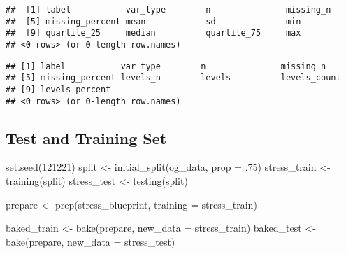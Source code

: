 \documentclass[
]{article}
\newenvironment{Shaded}{\begin{snugshade}}{\end{snugshade}}
\newcommand{\AttributeTok}[1]{\textcolor[rgb]{0.77,0.63,0.00}{#1}}
\newcommand{\DecValTok}[1]{\textcolor[rgb]{0.00,0.00,0.81}{#1}}
\newcommand{\FunctionTok}[1]{\textcolor[rgb]{0.00,0.00,0.00}{#1}}
\newcommand{\NormalTok}[1]{#1}
\newcommand{\OtherTok}[1]{\textcolor[rgb]{0.56,0.35,0.01}{#1}}
\newcommand{\SpecialCharTok}[1]{\textcolor[rgb]{0.00,0.00,0.00}{#1}}
\begin{document}
\begin{verbatim}
##  [1] label           var_type        n               missing_n      
##  [5] missing_percent mean            sd              min            
##  [9] quartile_25     median          quartile_75     max            
## <0 rows> (or 0-length row.names)
\end{verbatim}

\begin{Shaded}
\end{Shaded}

\begin{verbatim}
## [1] label           var_type        n               missing_n      
## [5] missing_percent levels_n        levels          levels_count   
## [9] levels_percent 
## <0 rows> (or 0-length row.names)
\end{verbatim}

\hypertarget{test-and-training-set}{%
\subsection{Test and Training Set}\label{test-and-training-set}}

\begin{Shaded}
\begin{Highlighting}[]
  \FunctionTok{set.seed}\NormalTok{(}\DecValTok{121221}\NormalTok{)}
\NormalTok{  split }\OtherTok{\textless{}{-}} \FunctionTok{initial\_split}\NormalTok{(og\_data, }\AttributeTok{prop =}\NormalTok{ .}\DecValTok{75}\NormalTok{)}
\NormalTok{  stress\_train }\OtherTok{\textless{}{-}} \FunctionTok{training}\NormalTok{(split)}
\NormalTok{  stress\_test }\OtherTok{\textless{}{-}} \FunctionTok{testing}\NormalTok{(split)}
  
\NormalTok{prepare }\OtherTok{\textless{}{-}} \FunctionTok{prep}\NormalTok{(stress\_blueprint, }
                \AttributeTok{training =}\NormalTok{ stress\_train)}

\NormalTok{baked\_train }\OtherTok{\textless{}{-}} \FunctionTok{bake}\NormalTok{(prepare, }\AttributeTok{new\_data =}\NormalTok{ stress\_train)}
\NormalTok{baked\_test }\OtherTok{\textless{}{-}} \FunctionTok{bake}\NormalTok{(prepare, }\AttributeTok{new\_data =}\NormalTok{ stress\_test)}
\end{Highlighting}
\end{Shaded}
\end{document}
